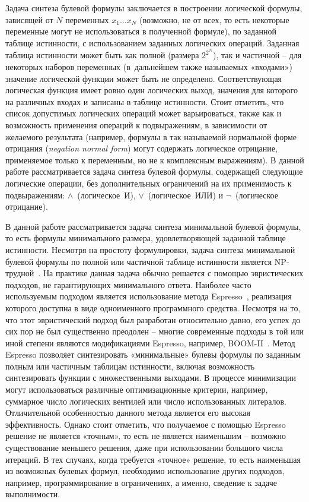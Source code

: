 Задача синтеза булевой формулы заключается в построении логической формулы, зависящей от $N$ переменных $x_{1}\ldots x_{N}$ (возможно, не от всех, то есть некоторые переменные могут не использоваться в полученной формуле), по заданной таблице истинности, с использованием заданных логических операций. Заданная таблица истинности может быть как полной (размера $2^{2^{N}}$), так и частичной \--- для некоторых наборов переменных (в~дальнейшем также называемых «входами») значение логической функции может быть не определено. Соответствующая логическая функция имеет ровно один логических выход, значения для которого на различных входах и записаны в таблице истинности. Стоит отметить, что список допустимых логических операций может варьироваться, также как и возможность применения операций к подвыражениям, в зависимости от желаемого результата (например, формулы в так называемой нормальной форме отрицания (\textit{negation normal form}) могут содержать логическое отрицание, применяемое только к переменным, но не к комплексным выражениям). В данной работе рассматривается задача синтеза булевой формулы, содержащей следующие логические операции, без дополнительных ограничений на их применимость к подвыражениям: $\land$~(логическое~И), $\lor$~(логическое~ИЛИ) и $\neg$~(логическое отрицание).

В данной работе рассматривается задача синтеза минимальной булевой формулы, то есть формулы минимального размера, удовлетворяющей заданной таблице истинности. Несмотря на простоту формулировки, задача синтеза минимальной булевой формулы по полной или частичной таблице истинности является NP-трудной~\cite{Aks18}. На практике данная задача обычно решается с помощью эвристических подходов, не гарантирующих минимального ответа. Наиболее часто используемым подходом является использование метода Espresso~\cite{Bra84}, реализация которого доступна в виде одноименного программного средства. Несмотря на то, что этот эвристический подход был разработан относительно давно, его успех до сих пор не был существенно преодолен \--- многие современные подходы в той или иной степени являются модификациями Espresso, например, BOOM-II~\cite{Fis06}. Метод Espresso позволяет синтезировать «минимальные» булевы формулы по заданным полным или частичным таблицам истинности, включая возможность синтезировать функции с множественными выходами. В процессе минимизации могут использоваться различные оптимизационные критерии, например, суммарное число логических вентилей или число использованных литералов. Отличительной особенностью данного метода является его высокая эффективность. Однако стоит отметить, что получаемое с помощью Espresso решение не является «точным», то есть не является наименьшим \--- возможно существование меньшего решения, даже при использовании большого числа итераций. В тех случаях, когда требуется «точное» решение, то есть наименьшая из возможных булевых формул, необходимо использование других подходов, например, программирование в ограничениях, а именно, сведение к задаче выполнимости.

